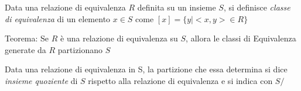 
Data una relazione di equivalenza $R$ definita su un insieme $S$, si definisce
\emph{classe di equivalenza} di un elemento $x \in S$ come $[x] = \{y | <x,y> \in R \}$

Teorema: Se $R$ è una relazione di equivalenza su $S$, allora le classi di Equivalenza
generate da $R$ partizionano $S$


Data una relazione di equivalenza in S, la partizione che essa determina si dice
\emph{insieme quoziente} di $S$ rispetto alla relazione di equivalenza e si indica con $S/$

%
